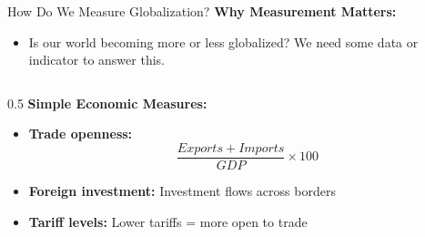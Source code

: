 \documentclass{beamer}
\begin{document}
\begin{frame}{How Do We Measure Globalization?}
\small
\textbf{Why Measurement Matters:}
\begin{itemize}
    \item Is our world becoming more or less globalized? We need some data or indicator to answer this.
\end{itemize}

\vspace{0.3cm}

\begin{columns}
\begin{column}{0.5\textwidth}
    \textbf{Simple Economic Measures:}
    \begin{itemize} \footnotesize
        \item \textbf{Trade openness:} 
        \begin{equation*}
        \frac{Exports + Imports}{GDP} \times 100
        \end{equation*}
        \item \textbf{Foreign investment:} Investment flows across borders 
        \item \textbf{Tariff levels:} Lower tariffs = more open to trade %

\end{itemize}
\end{column}
\end{columns}
\end{frame}
\end{document}
